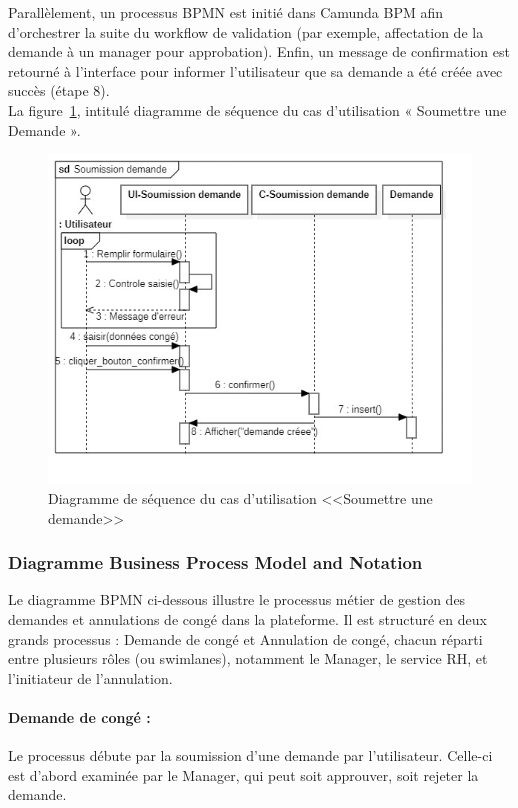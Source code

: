 Parallèlement, un processus BPMN est initié dans Camunda BPM afin d’orchestrer la suite du workflow de validation (par exemple, affectation de la demande à un manager pour approbation). Enfin, un message de confirmation est retourné à l’interface pour informer l’utilisateur que sa demande a été créée avec succès (étape 8).\\
La figure~\ref{fig:sequence_submit_request}, intitulé diagramme de séquence du cas d’utilisation « Soumettre une Demande ».
\newpage
\begin{figure}[ht]
     \centering
     \includegraphics[width=17cm, height=0.9\textheight, keepaspectratio]{images/S_Soumission demande.jpg}
     \caption{Diagramme de séquence du cas d'utilisation <<Soumettre une demande>>}
     \label{fig:sequence_submit_request}
\end{figure}
\subsubsection{Diagramme Business Process Model and Notation}
Le diagramme BPMN ci-dessous illustre le processus métier de gestion des demandes et annulations de congé dans la plateforme. Il est structuré en deux grands processus : Demande de congé et Annulation de congé, chacun réparti entre plusieurs rôles (ou swimlanes), notamment le Manager, le service RH, et l’initiateur de l’annulation.
\paragraph{Demande de congé :}
Le processus débute par la soumission d’une demande par l’utilisateur. Celle-ci est d'abord examinée par le Manager, qui peut soit approuver, soit rejeter la demande.


